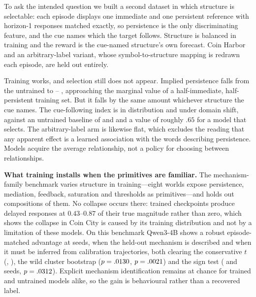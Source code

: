 To ask the intended question we built a second dataset in which structure is
selectable: each episode displays one immediate and one persistent reference
with horizon-1 responses matched exactly, so persistence is the only
discriminating feature, and the cue names which the target follows. Structure
is balanced in training and the reward is the cue-named structure's own
forecast. Coin Harbor and an arbitrary-label variant, whose symbol-to-structure
mapping is redrawn each episode, are held out entirely.

Training works, and selection still does not appear. Implied persistence falls
from the untrained \eSelBasePersistMed{} to \eSelTrainedPersistLo--%
\eSelTrainedPersistHi{}, approaching the marginal value of a half-immediate,
half-persistent training set. But it falls by the same amount whichever
structure the cue names. The cue-following index is \eSelCitySemEst{}
\eSelCitySemCi{} in distribution and \eSelHarborSemEst{} \eSelHarborSemCi{}
under domain shift, against an untrained baseline of \eSelCitySemBase{} and
\eSelHarborSemBase{} and a value of roughly $.65$ for a model that selects. The
arbitrary-label arm is likewise flat, which excludes the reading that any
apparent effect is a learned association with the words describing persistence.
Models acquire the average relationship, not a policy for choosing between
relationships.

\textbf{What training installs when the primitives are familiar.}
The mechanism-family benchmark varies structure in training---eight worlds
expose persistence, mediation, feedback, saturation and thresholds as
primitives---and holds out compositions of them. No collapse occurs there:
trained checkpoints produce delayed responses at $0.43$--$0.87$ of their true
magnitude rather than zero, which shows the collapse in Coin City is caused by
its training distribution and not by a limitation of these models. On this
benchmark Qwen3-4B shows a robust episode-matched advantage at
\eMechG{} seeds, \eMechDiscEst{} \eMechDiscCi{} when the held-out mechanism is
described and \eMechUndiscEst{} \eMechUndiscCi{} when it must be inferred from
calibration trajectories, both clearing the conservative $t$
(\eMechDiscTci{}, \eMechUndiscTci{}), the wild cluster bootstrap
($p=.0130{}$, $p=.0021{}$) and the sign test
(\eMechDiscSign{} and \eMechUndiscSign{} seeds, $p=.0312{}$). Explicit
mechanism identification remains at chance for trained and untrained models
alike, so the gain is behavioural rather than a recovered label.

